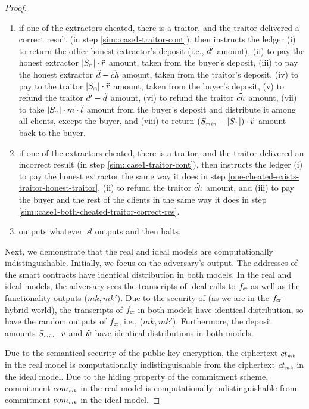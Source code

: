 \begin{proof}
\begin{enumerate}
\begin{enumerate}
%
\item if one of the extractors cheated, there is a traitor, and the traitor delivered a correct result (in step \ref{sim::case1-traitor-cont}), then instructs the ledger (i) to return the other honest extractor's deposit (i.e., $\ddot{d}'$ amount), (ii) to pay the honest extractor $|S_{\scriptscriptstyle\cap}|\cdot \ddot{r}$ amount, taken from the buyer's deposit,  (iii) to pay the honest extractor $\ddot{d}- \ddot{ch}$ amount, taken from the traitor's deposit,   (iv) to pay to the traitor $|S_{\scriptscriptstyle\cap}|\cdot \ddot{r}$ amount, taken from the buyer’s deposit,  (v) to refund the traitor $\ddot{d}'-\ddot{d}$ amount, (vi) to refund the traitor $\ddot{ch}$ amount,  (vii) to take $|S_{\scriptscriptstyle\cap}|\cdot m\cdot \ddot{l}$ amount from the buyer's deposit and distribute it among all clients, except the buyer, and (viii) to return $(S_{\scriptscriptstyle min}-|S_{\scriptscriptstyle\cap}|)\cdot \ddot{v}$ amount back  to the buyer. 
%
\item if one of the extractors cheated, there is a traitor, and the traitor delivered an incorrect result (in step \ref{sim::case1-traitor-cont}), then instructs the ledger (i) to pay the honest extractor the same way it does in step \ref{one-cheated-exists-traitor-honest-traitor}, (ii) to refund the traitor  $\ddot{ch}$ amount, and (iii)  to pay the buyer and the rest of the clients in the same way it does in step \ref{sim::case1-both-cheated-traitor-correct-res}.
%
\item outputs whatever $\mathcal{A}$ outputs and then halts.
%
\end{enumerate}
%
\end{enumerate}



Next, we demonstrate that the real and ideal models are computationally indistinguishable. Initially, we focus on the adversary’s output. The addresses of the smart contracts have identical distribution in both models. In the real and ideal models, the adversary sees the transcripts of ideal calls to $f_{\scriptscriptstyle \mathtt{CT}}$ as well as the functionality outputs ($mk,  mk'$). Due to the security of \ct (as we are in the $f_{\scriptscriptstyle \mathtt{CT}}$-hybrid world), the transcripts of $f_{\scriptscriptstyle \mathtt{CT}}$ in both models have identical distribution, so have the random outputs of $f_{\scriptscriptstyle \mathtt{CT}}$, i.e., ($mk,  mk'$). Furthermore, the deposit amounts $S_{\scriptscriptstyle min}\cdot \ddot{v}$ and $\ddot{w}$ have identical distributions in both models. 

Due to the semantical security of the public key encryption, the ciphertext $ct_{\scriptscriptstyle mk}$ in the real model is computationally indistinguishable from the ciphertext $ct_{\scriptscriptstyle {mk}}$ in the ideal model. Due to the hiding property of the commitment scheme, commitment $com_{\scriptscriptstyle mk}$ in the real model is computationally indistinguishable from commitment $com_{\scriptscriptstyle {mk}}$ in the ideal model.  


\end{proof}
